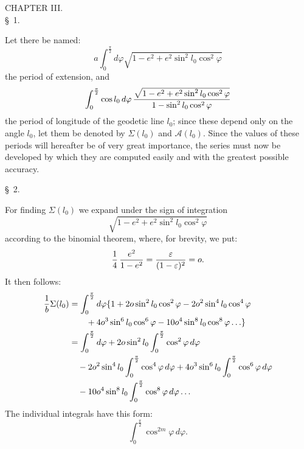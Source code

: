 \begin{center}
{\large CHAPTER III.}\\[0.8em]
\S\ 1.
\end{center}

Let there be named:
\[
 a\int_0^{\frac\pi2} d\varphi\sqrt{1-e^2+e^2\sin^2 l_0\cos^2\varphi}
\]
the period of extension, and
\[
 \int_0^{\frac\pi2}\cos l_0\,d\varphi\,
 {\sqrt{1-e^2+e^2\sin^2 l_0\cos^2\varphi}\over 1-\sin^2 l_0\cos^2\varphi}
\]
the period of longitude of the geodetic line $l_0$; since these depend only on the angle $l_0$, let them be denoted by $\Sigma(l_0)$ and $\mathcal A(l_0)$. Since the values of these periods will hereafter be of very great importance, the series must now be developed by which they are computed easily and with the greatest possible accuracy.

\begin{center}\S\ 2.\end{center}

For finding $\Sigma(l_0)$ we expand under the sign of integration
\[
 \sqrt{1-e^2+e^2\sin^2 l_0\cos^2\varphi}
\]
according to the binomial theorem, where, for brevity, we put:
\[
 {1\over4}\,{e^2\over1-e^2}={\varepsilon\over(1-\varepsilon)^2}=o.
\]
It then follows:
\[
\begin{aligned}
 {1\over b}\Sigma(l_0)
 &=\int_0^{\frac\pi2}d\varphi\{1+2o\sin^2l_0\cos^2\varphi-2o^2\sin^4l_0\cos^4\varphi\\
 &\qquad{}+4o^3\sin^6l_0\cos^6\varphi-10o^4\sin^8l_0\cos^8\varphi\ldots\}\\
 &=\int_0^{\frac\pi2}d\varphi+2o\sin^2l_0\int_0^{\frac\pi2}\cos^2\varphi\,d\varphi\\
 &\quad{}-2o^2\sin^4l_0\int_0^{\frac\pi2}\cos^4\varphi\,d\varphi
 +4o^3\sin^6l_0\int_0^{\frac\pi2}\cos^6\varphi\,d\varphi\\
 &\quad{}-10o^4\sin^8l_0\int_0^{\frac\pi2}\cos^8\varphi\,d\varphi\ldots
\end{aligned}
\]
The individual integrals have this form:
\[
 \int_0^{\frac\pi2}\cos^{2m}\varphi\,d\varphi.
\]
